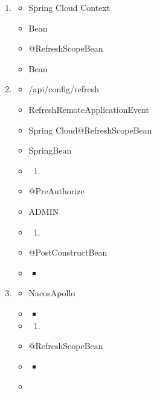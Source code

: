 \important{}

\begin{enumerate}
\def\labelenumi{\arabic{enumi}.}
\item

  \begin{itemize}
  \tightlist
  \item
    Spring Cloud Context
  \item
    Bean
  \item
    @RefreshScopeBean
  \item
    Bean
  \end{itemize}
\item
  \important{}

  \begin{itemize}
  \item
    /api/config/refresh
  \item
    RefreshRemoteApplicationEvent
  \item
    Spring Cloud@RefreshScopeBean
  \item
    SpringBean
  \item
    \begin{enumerate}
    \def\labelenumii{\arabic{enumii}.}
        \item
      \important{}
    \end{enumerate}
  \item
    @PreAuthorize
  \item
    ADMIN
  \item
    \begin{enumerate}
    \def\labelenumii{\arabic{enumii}.}
        \item
      \important{}
    \end{enumerate}
  \item
    @PostConstructBean
  \item
    \begin{itemize}
    \tightlist
    \item
    \end{itemize}
  \end{itemize}
\item
  \important{}

  \begin{itemize}
  \item
    NacosApollo
  \item
    \begin{itemize}
    \tightlist
    \item
    \end{itemize}
  \item
    \begin{enumerate}
    \def\labelenumii{\arabic{enumii}.}
        \item
      \important{}
    \end{enumerate}
  \item
    @RefreshScopeBean
  \item
    \begin{itemize}
    \tightlist
    \item
    \end{itemize}
  \item ~
    \hypertarget{spring-boot-3}{%
}
\end{itemize}
\end{enumerate}
